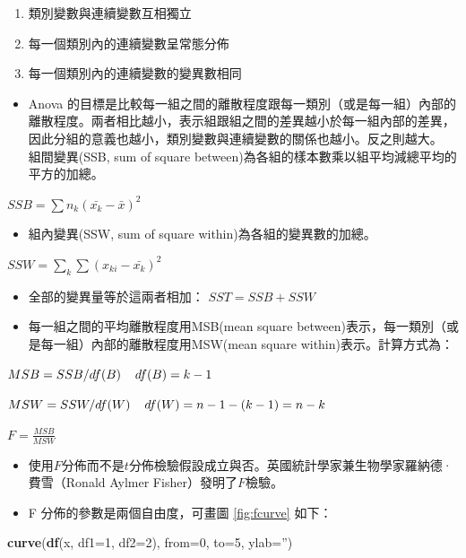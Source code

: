 \documentclass[hyperref,]{ctexart}
\newenvironment{Shaded}{\begin{snugshade}}{\end{snugshade}}
\newcommand{\DataTypeTok}[1]{\textcolor[rgb]{0.13,0.29,0.53}{#1}}
\newcommand{\DecValTok}[1]{\textcolor[rgb]{0.00,0.00,0.81}{#1}}
\newcommand{\KeywordTok}[1]{\textcolor[rgb]{0.13,0.29,0.53}{\textbf{#1}}}
\newcommand{\NormalTok}[1]{#1}
\newcommand{\StringTok}[1]{\textcolor[rgb]{0.31,0.60,0.02}{#1}}
\providecommand{\tightlist}{%
  \setlength{\itemsep}{0pt}\setlength{\parskip}{0pt}}
\begin{document}
\begin{enumerate}
\def\labelenumi{\arabic{enumi}.}
\tightlist
\item
  類別變數與連續變數互相獨立
\item
  每一個類別內的連續變數呈常態分佈
\item
  每一個類別內的連續變數的變異數相同
\end{enumerate}

\begin{itemize}
\tightlist
\item
  Anova
  的目標是比較每一組之間的離散程度跟每一類別（或是每一組）內部的離散程度。兩者相比越小，表示組跟組之間的差異越小於每一組內部的差異，因此分組的意義也越小，類別變數與連續變數的關係也越小。反之則越大。
  組間變異(SSB, sum of square
  between)為各組的樣本數乘以組平均減總平均的平方的加總。
\end{itemize}

\(SSB=\sum n_{k}(\bar{x_{k}}-\bar{x})^2\)

\begin{itemize}
\tightlist
\item
  組內變異(SSW, sum of square within)為各組的變異數的加總。
\end{itemize}

\(SSW=\sum_{k}\sum (x_{ki}-\bar{x_{k}})^2\)

\begin{itemize}
\item
  全部的變異量等於這兩者相加： \(SST=SSB+SSW\)
\item
  每一組之間的平均離散程度用MSB(mean square
  between)表示，每一類別（或是每一組）內部的離散程度用MSW(mean square
  within)表示。計算方式為：
\end{itemize}

\(MSB=SSB/df(B) \hspace{.4cm} df(B)=k-1\)

\(MSW=SSW/df(W) \hspace{.4cm} df(W)=n-1-(k-1)=n-k\)

\(F=\frac{MSB}{MSW}\)

\begin{itemize}
\item
  使用\(F\)分佈而不是\(t\)分佈檢驗假設成立與否。英國統計學家兼生物學家羅納德·費雪（Ronald
  Aylmer Fisher）發明了\(F\)檢驗。
\item
  F 分佈的參數是兩個自由度，可畫圖 \ref{fig:fcurve} 如下：
\end{itemize}

\begin{Shaded}
\begin{Highlighting}[]
\KeywordTok{curve}\NormalTok{(}\KeywordTok{df}\NormalTok{(x, }\DataTypeTok{df1=}\DecValTok{1}\NormalTok{, }\DataTypeTok{df2=}\DecValTok{2}\NormalTok{), }\DataTypeTok{from=}\DecValTok{0}\NormalTok{, }\DataTypeTok{to=}\DecValTok{5}\NormalTok{, }\DataTypeTok{ylab=}\StringTok{''}\NormalTok{)}
\end{Highlighting}
\end{Shaded}
\end{document}

